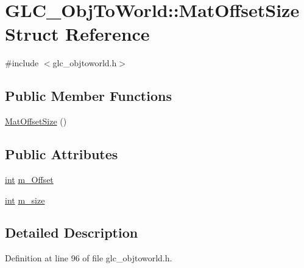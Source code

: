 \hypertarget{struct_g_l_c___obj_to_world_1_1_mat_offset_size}{\section{G\-L\-C\-\_\-\-Obj\-To\-World\-:\-:Mat\-Offset\-Size Struct Reference}
\label{struct_g_l_c___obj_to_world_1_1_mat_offset_size}
}


{\ttfamily \#include $<$glc\-\_\-objtoworld.\-h$>$}

\subsection*{Public Member Functions}
\begin{DoxyCompactItemize}
\item 
\hyperlink{struct_g_l_c___obj_to_world_1_1_mat_offset_size_a82471ccf2412559b28ecacd025d06a34}{Mat\-Offset\-Size} ()
\end{DoxyCompactItemize}
\subsection*{Public Attributes}
\begin{DoxyCompactItemize}
\item 
\hyperlink{ioapi_8h_a787fa3cf048117ba7123753c1e74fcd6}{int} \hyperlink{struct_g_l_c___obj_to_world_1_1_mat_offset_size_a3fa5ae0c58ee5399e4b3002375c73c13}{m\-\_\-\-Offset}
\item 
\hyperlink{ioapi_8h_a787fa3cf048117ba7123753c1e74fcd6}{int} \hyperlink{struct_g_l_c___obj_to_world_1_1_mat_offset_size_a0e5e296b6951b15f62403e79698fef6a}{m\-\_\-size}
\end{DoxyCompactItemize}


\subsection{Detailed Description}


Definition at line 96 of file glc\-\_\-objtoworld.\-h.



